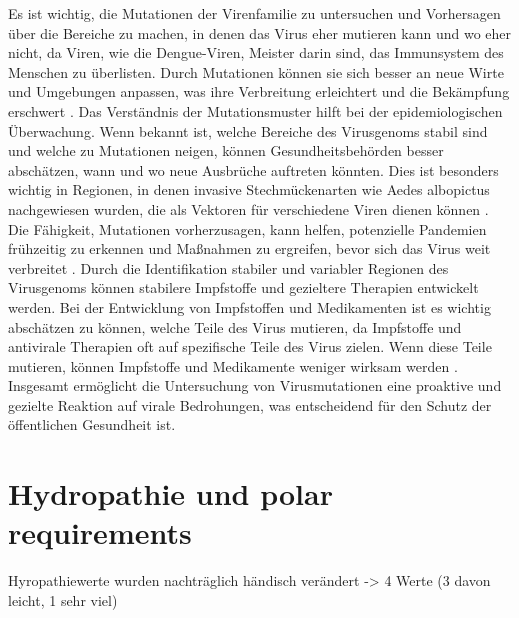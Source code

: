 \documentclass[german,version-2022-01]{uzl-thesis}
\begin{document}
Es ist wichtig, die Mutationen der Virenfamilie zu untersuchen und Vorhersagen \"uber die Bereiche zu machen, in denen das Virus eher mutieren kann und wo eher nicht, da Viren, wie die Dengue-Viren, Meister darin sind, das Immunsystem des Menschen zu \"uberlisten. Durch Mutationen k\"onnen sie sich besser an neue Wirte und Umgebungen anpassen, was ihre Verbreitung erleichtert und die Bek\"ampfung erschwert \cite{cramer_dengue-virus_2014}\cite{janisch_klein_2017}. Das Verst\"andnis der Mutationsmuster hilft bei der epidemiologischen \"Uberwachung. Wenn bekannt ist, welche Bereiche des Virusgenoms stabil sind und welche zu Mutationen neigen, k\"onnen Gesundheitsbeh\"orden besser absch\"atzen, wann und wo neue Ausbr\"uche auftreten k\"onnten. Dies ist besonders wichtig in Regionen, in denen invasive Stechm\"uckenarten wie Aedes albopictus nachgewiesen wurden, die als Vektoren f\"ur verschiedene Viren dienen k\"onnen \cite{cramer_dengue-virus_2014}. Die F\"ahigkeit, Mutationen vorherzusagen, kann helfen, potenzielle Pandemien fr\"uhzeitig zu erkennen und Ma\ss{}nahmen zu ergreifen, bevor sich das Virus weit verbreitet \cite{janisch_klein_2017}. Durch die Identifikation stabiler und variabler Regionen des Virusgenoms k\"onnen stabilere Impfstoffe und gezieltere Therapien entwickelt werden. Bei der Entwicklung von Impfstoffen und Medikamenten ist es wichtig absch\"atzen zu k\"onnen, welche Teile des Virus mutieren, da Impfstoffe und antivirale Therapien oft auf spezifische Teile des Virus zielen. Wenn diese Teile mutieren, k\"onnen Impfstoffe und Medikamente weniger wirksam werden \cite{janisch_klein_2017}. 
Insgesamt erm\"oglicht die Untersuchung von Virusmutationen eine proaktive und gezielte Reaktion auf virale Bedrohungen, was entscheidend f\"ur den Schutz der \"offentlichen Gesundheit ist.

\section{Hydropathie und polar requirements}
Hyropathiewerte wurden nachtr\"aglich h\"andisch ver\"andert -> 4 Werte (3 davon leicht, 1 sehr viel)
\end{document}
